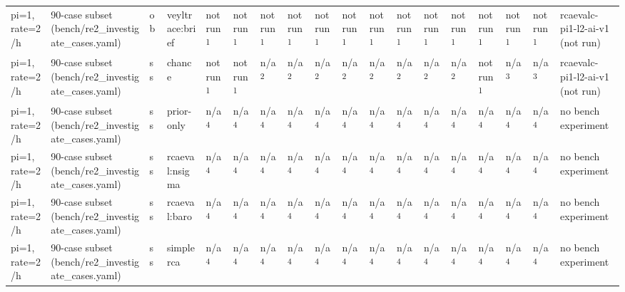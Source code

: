 \begin{table}[t]
\begin{tabular}{llllllllllllllllll}
pi=1, rate=2/h & 90-case subset (bench/re2\_investigate\_cases.yaml) & ob & veyltrace:brief & not run\textsuperscript{1} & not run\textsuperscript{1} & not run\textsuperscript{1} & not run\textsuperscript{1} & not run\textsuperscript{1} & not run\textsuperscript{1} & not run\textsuperscript{1} & not run\textsuperscript{1} & not run\textsuperscript{1} & not run\textsuperscript{1} & not run\textsuperscript{1} & not run\textsuperscript{1} & not run\textsuperscript{1} & rcaevalc-pi1-l2-ai-v1 (not run) \\
pi=1, rate=2/h & 90-case subset (bench/re2\_investigate\_cases.yaml) & ss & chance & not run\textsuperscript{1} & not run\textsuperscript{1} & n/a\textsuperscript{2} & n/a\textsuperscript{2} & n/a\textsuperscript{2} & n/a\textsuperscript{2} & n/a\textsuperscript{2} & n/a\textsuperscript{2} & n/a\textsuperscript{2} & n/a\textsuperscript{2} & not run\textsuperscript{1} & n/a\textsuperscript{3} & n/a\textsuperscript{3} & rcaevalc-pi1-l2-ai-v1 (not run) \\
pi=1, rate=2/h & 90-case subset (bench/re2\_investigate\_cases.yaml) & ss & prior-only & n/a\textsuperscript{4} & n/a\textsuperscript{4} & n/a\textsuperscript{4} & n/a\textsuperscript{4} & n/a\textsuperscript{4} & n/a\textsuperscript{4} & n/a\textsuperscript{4} & n/a\textsuperscript{4} & n/a\textsuperscript{4} & n/a\textsuperscript{4} & n/a\textsuperscript{4} & n/a\textsuperscript{4} & n/a\textsuperscript{4} & no bench experiment \\
pi=1, rate=2/h & 90-case subset (bench/re2\_investigate\_cases.yaml) & ss & rcaeval:nsigma & n/a\textsuperscript{4} & n/a\textsuperscript{4} & n/a\textsuperscript{4} & n/a\textsuperscript{4} & n/a\textsuperscript{4} & n/a\textsuperscript{4} & n/a\textsuperscript{4} & n/a\textsuperscript{4} & n/a\textsuperscript{4} & n/a\textsuperscript{4} & n/a\textsuperscript{4} & n/a\textsuperscript{4} & n/a\textsuperscript{4} & no bench experiment \\
pi=1, rate=2/h & 90-case subset (bench/re2\_investigate\_cases.yaml) & ss & rcaeval:baro & n/a\textsuperscript{4} & n/a\textsuperscript{4} & n/a\textsuperscript{4} & n/a\textsuperscript{4} & n/a\textsuperscript{4} & n/a\textsuperscript{4} & n/a\textsuperscript{4} & n/a\textsuperscript{4} & n/a\textsuperscript{4} & n/a\textsuperscript{4} & n/a\textsuperscript{4} & n/a\textsuperscript{4} & n/a\textsuperscript{4} & no bench experiment \\
pi=1, rate=2/h & 90-case subset (bench/re2\_investigate\_cases.yaml) & ss & simplerca & n/a\textsuperscript{4} & n/a\textsuperscript{4} & n/a\textsuperscript{4} & n/a\textsuperscript{4} & n/a\textsuperscript{4} & n/a\textsuperscript{4} & n/a\textsuperscript{4} & n/a\textsuperscript{4} & n/a\textsuperscript{4} & n/a\textsuperscript{4} & n/a\textsuperscript{4} & n/a\textsuperscript{4} & n/a\textsuperscript{4} & no bench experiment \\

\end{tabular}
\end{table}
